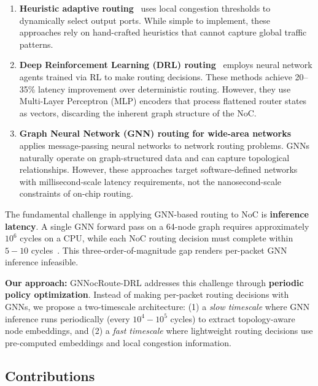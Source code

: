 \begin{enumerate}
    \item \textbf{Heuristic adaptive routing}~\cite{dyad2004,ebrahimi2019} uses local congestion thresholds to dynamically select output ports. While simple to implement, these approaches rely on hand-crafted heuristics that cannot capture global traffic patterns.
    
    \item \textbf{Deep Reinforcement Learning (DRL) routing}~\cite{wang2022maar,deepnr2022,garnn2023} employs neural network agents trained via RL to make routing decisions. These methods achieve 20--35\% latency improvement over deterministic routing. However, they use Multi-Layer Perceptron (MLP) encoders that process flattened router states as vectors, discarding the inherent graph structure of the NoC.
    
    \item \textbf{Graph Neural Network (GNN) routing for wide-area networks}~\cite{g-routing2023,drl-gnn2019} applies message-passing neural networks to network routing problems. GNNs naturally operate on graph-structured data and can capture topological relationships. However, these approaches target software-defined networks with millisecond-scale latency requirements, not the nanosecond-scale constraints of on-chip routing.
\end{enumerate}

The fundamental challenge in applying GNN-based routing to NoC is \textbf{inference latency}. A single GNN forward pass on a 64-node graph requires approximately $10^6$ cycles on a CPU, while each NoC routing decision must complete within $5-10$ cycles~\cite{wang2022maar}. This three-order-of-magnitude gap renders per-packet GNN inference infeasible.

\textbf{Our approach:} GNNocRoute-DRL addresses this challenge through \textbf{periodic policy optimization}. Instead of making per-packet routing decisions with GNNs, we propose a two-timescale architecture: (1) a \textit{slow timescale} where GNN inference runs periodically (every $10^4-10^5$ cycles) to extract topology-aware node embeddings, and (2) a \textit{fast timescale} where lightweight routing decisions use pre-computed embeddings and local congestion information.

\subsection{Contributions}

